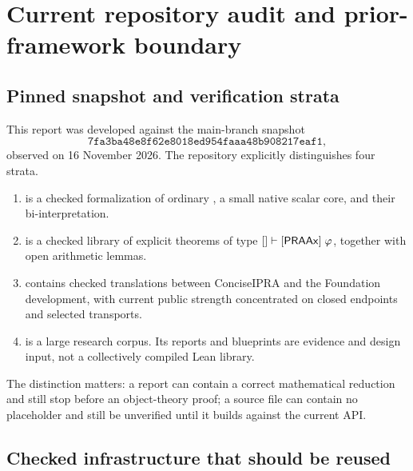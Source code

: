 \section{Current repository audit and prior-framework boundary}\label{sec:audit}

\subsection{Pinned snapshot and verification strata}

This report was developed against the main-branch snapshot
\[
 \texttt{7fa3ba48e8f62e8018ed954faaa48b908217eaf1},
\]
observed on 16 November 2026.  The repository explicitly distinguishes four strata.
\begin{enumerate}
  \item {} is a checked formalization of ordinary \iPRA, a small native scalar core, and their bi-interpretation.
  \item {} is a checked library of explicit theorems of type \([]\mathrel{\vdash[\mathsf{PRAAx}]}\varphi\), together with open arithmetic lemmas.
  \item {} contains checked translations between ConciseIPRA and the Foundation development, with current public strength concentrated on closed endpoints and selected transports.
  \item {} is a large research corpus.  Its reports and blueprints are evidence and design input, not a collectively compiled Lean library.
\end{enumerate}
The distinction matters: a report can contain a correct mathematical reduction and still stop before an object-theory proof; a source file can contain no placeholder and still be unverified until it builds against the current API.

\subsection{Checked infrastructure that should be reused}

